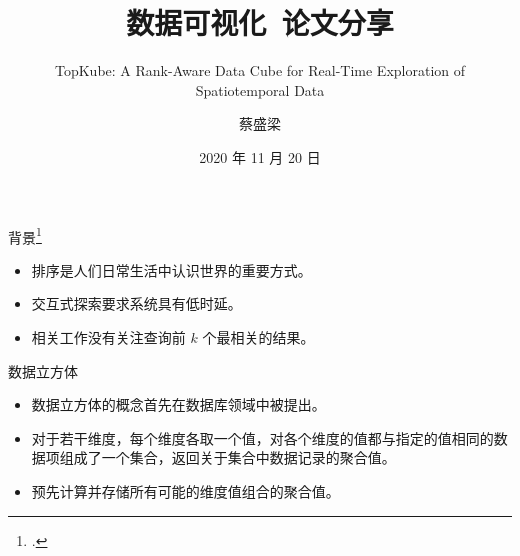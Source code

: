 \documentclass[10pt,aspectratio=169]{ctexbeamer}
\title{数据可视化\, 论文分享}
\subtitle{TopKube: A Rank-Aware Data Cube for Real-Time Exploration of Spatiotemporal Data}
\author{蔡盛梁}
\institute{华东师范大学计算机科学与技术学院}
\date{2020 年 11 月 20 日}
\begin{document}
\begin{frame}
    \titlepage
\end{frame}

\begin{frame}{背景\footcite{Miranda2018}}
    \begin{itemize}[<+->]
        \item 排序是人们日常生活中认识世界的重要方式。
        \item 交互式探索要求系统具有低时延。
        \item 相关工作没有关注查询前 $k$ 个最相关的结果。
    \end{itemize}
\end{frame}

\begin{frame}{数据立方体}
    \begin{itemize}[<+->]
        \item 数据立方体的概念首先在数据库领域中被提出。
        \item 对于若干维度，每个维度各取一个值，对各个维度的值都与指定的值相同的数据项组成了一个集合，返回关于集合中数据记录的聚合值。
        \item 预先计算并存储所有可能的维度值组合的聚合值。
    \end{itemize}
\end{frame}
\end{document}
